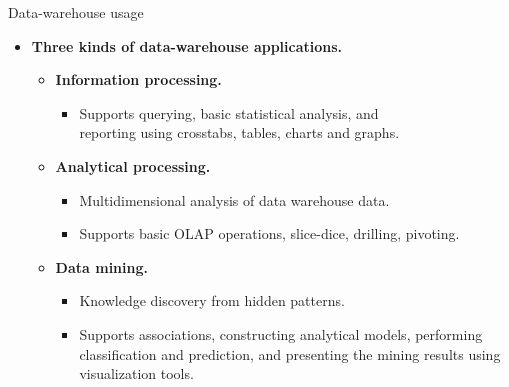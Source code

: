\documentclass[aspectratio=169,t]{beamer}
\begin{document}
  { 
    \begin{frame}{Data-warehouse usage}
        \begin{itemize}
            \item \textbf{Three kinds of data-warehouse applications.}
            \begin{itemize}
              \item \textbf{\color{airforceblue}Information processing.}
              \begin{itemize}
                  \item Supports querying, basic statistical analysis, and \\ reporting using crosstabs, tables, charts and graphs.
              \end{itemize}
              \item \textbf{\color{airforceblue}Analytical processing.}
              \begin{itemize}
                  \item Multidimensional analysis of data warehouse data.
                  \item Supports basic OLAP operations, slice-dice, drilling, pivoting.
              \end{itemize}
              \item \textbf{\color{airforceblue}Data mining.}
              \begin{itemize}
                  \item Knowledge discovery from hidden patterns.
                  \item Supports associations, constructing analytical models, performing classification and prediction, and presenting the mining results using visualization tools.
              \end{itemize}
        \end{itemize}
      \end{itemize}
    \end{frame}
  }
\end{document}
